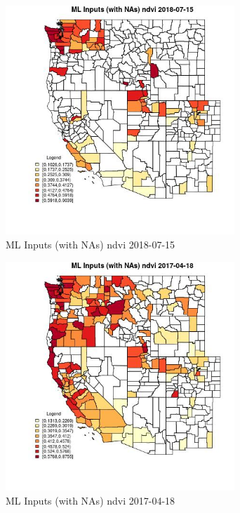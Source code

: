 \begin{figure} 
\centering  
\includegraphics[width=0.77\textwidth]{Code_Outputs/Report_ML_input_PM25_Step4_part_e_de_duplicated_aves_compiled_2019-05-21wNAs_CountyndviMean2018-07-15.jpg} 
\caption{\label{fig:Report_ML_input_PM25_Step4_part_e_de_duplicated_aves_compiled_2019-05-21wNAsCountyndviMean2018-07-15}ML Inputs (with NAs) ndvi 2018-07-15} 
\end{figure} 
 

\begin{figure} 
\centering  
\includegraphics[width=0.77\textwidth]{Code_Outputs/Report_ML_input_PM25_Step4_part_e_de_duplicated_aves_compiled_2019-05-21wNAs_CountyndviMean2017-04-18.jpg} 
\caption{\label{fig:Report_ML_input_PM25_Step4_part_e_de_duplicated_aves_compiled_2019-05-21wNAsCountyndviMean2017-04-18}ML Inputs (with NAs) ndvi 2017-04-18} 
\end{figure} 
 

